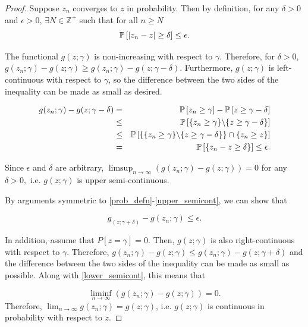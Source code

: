 \documentclass[12pt,oneside,final]{thesis}\usepackage[]{graphicx}\usepackage[]{color}
\begin{document}
\begin{proof}
Suppose $z_n$ converges to $z$ in probability. Then by definition, for any  $\delta>0$ and  $\epsilon>0$, $\exists	N\in\mathbb{Z^+}$ such that for all   $n \geq N$ 
$$ \mathbb{P}\left[\left|z_n-z\right| \geq \delta \right] \leq \epsilon.$$

 The functional  $g(z;\gamma)$ is  non-increasing with respect to $\gamma$. Therefore, for $\delta>0$, 
$g(z_n;\gamma) -g(z;\gamma) \geq g(z_n;\gamma) -g(z;\gamma-\delta) $. Furthermore, $g(z;\gamma)$ is left-continuous with respect to $\gamma$, so the difference between the two sides of the inequality can be made as small as desired.

\begin{eqnarray}
g(z_n;\gamma) - g(z;\gamma-\delta) & = &\mathbb{P}\left[z_n\geq \gamma \right] -\mathbb{P}\left[z \geq  \gamma - \delta \right] \label{prob_defn}\\
& \leq &  \mathbb{P}\left[\{z_n \geq \gamma \} \backslash \{z \geq \gamma - \delta \} \right] \label{set_diff}\\
& \leq & \mathbb{P}\left[\{\{z_n \geq \gamma \} \backslash \{z \geq \gamma - \delta \} \} \cap \{z_n \geq  z\} \right] \label{conjunct_with_set} \\
& =  & \mathbb{P}\left[\{z_n - z \geq \delta \} \right] \leq \epsilon. \label{upper_semicont}
\end{eqnarray}
 
Since $\epsilon$ and $\delta$ are arbitrary,
 $ \limsup_{n \rightarrow \infty} ( {g(z_n;\gamma)}- g(z;\gamma) ) =  0$ for any $\delta>0, $ i.e. $g(z;\gamma)$ is upper semi-continuous.

By arguments  symmetric to  \eqref{prob_defn}-\eqref{upper_semicont}, we can show that

\begin{equation}
g_(z;\gamma+\delta) - g(z_n;\gamma) \leq \epsilon. \label{lower_semicont}
\end{equation}


In addition, assume that  $P\left[z = \gamma \right]=0$. Then, $g(z;\gamma)$ is also right-continuous with respect to $\gamma$. Therefore, 
$g(z_n;\gamma) -g(z;\gamma) \leq g(z_n;\gamma) -g(z;\gamma+\delta)$ and the difference between the two sides of the inequality can be made as small as possible. 
Along with \eqref{lower_semicont}, this means that

 \[ 
\liminf_{n \rightarrow \infty} ( {g(z_n;\gamma)}- g(z;\gamma) ) = 0. 
\] Therefore, $\lim_{n\rightarrow \infty}g(z_n;\gamma) = g(z;\gamma)$, i.e. $g(z;\gamma)$ is continuous in probability with respect to $z$.
\end{proof}
\end{document}
